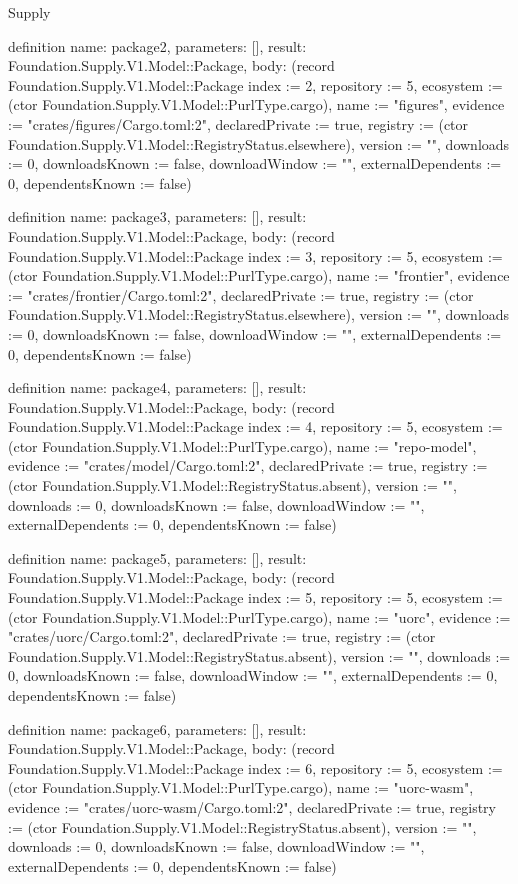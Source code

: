 \begin{lexlean}{Supply}
\begin{semanticmodule}
definition{
  name: package2,
  parameters: [],
  result: Foundation.Supply.V1.Model::Package,
  body: (record Foundation.Supply.V1.Model::Package {index := 2, repository := 5, ecosystem := (ctor Foundation.Supply.V1.Model::PurlType.cargo), name := "figures", evidence := "crates/figures/Cargo.toml:2", declaredPrivate := true, registry := (ctor Foundation.Supply.V1.Model::RegistryStatus.elsewhere), version := "", downloads := 0, downloadsKnown := false, downloadWindow := "", externalDependents := 0, dependentsKnown := false})
}

definition{
  name: package3,
  parameters: [],
  result: Foundation.Supply.V1.Model::Package,
  body: (record Foundation.Supply.V1.Model::Package {index := 3, repository := 5, ecosystem := (ctor Foundation.Supply.V1.Model::PurlType.cargo), name := "frontier", evidence := "crates/frontier/Cargo.toml:2", declaredPrivate := true, registry := (ctor Foundation.Supply.V1.Model::RegistryStatus.elsewhere), version := "", downloads := 0, downloadsKnown := false, downloadWindow := "", externalDependents := 0, dependentsKnown := false})
}

definition{
  name: package4,
  parameters: [],
  result: Foundation.Supply.V1.Model::Package,
  body: (record Foundation.Supply.V1.Model::Package {index := 4, repository := 5, ecosystem := (ctor Foundation.Supply.V1.Model::PurlType.cargo), name := "repo-model", evidence := "crates/model/Cargo.toml:2", declaredPrivate := true, registry := (ctor Foundation.Supply.V1.Model::RegistryStatus.absent), version := "", downloads := 0, downloadsKnown := false, downloadWindow := "", externalDependents := 0, dependentsKnown := false})
}

definition{
  name: package5,
  parameters: [],
  result: Foundation.Supply.V1.Model::Package,
  body: (record Foundation.Supply.V1.Model::Package {index := 5, repository := 5, ecosystem := (ctor Foundation.Supply.V1.Model::PurlType.cargo), name := "uorc", evidence := "crates/uorc/Cargo.toml:2", declaredPrivate := true, registry := (ctor Foundation.Supply.V1.Model::RegistryStatus.absent), version := "", downloads := 0, downloadsKnown := false, downloadWindow := "", externalDependents := 0, dependentsKnown := false})
}

definition{
  name: package6,
  parameters: [],
  result: Foundation.Supply.V1.Model::Package,
  body: (record Foundation.Supply.V1.Model::Package {index := 6, repository := 5, ecosystem := (ctor Foundation.Supply.V1.Model::PurlType.cargo), name := "uorc-wasm", evidence := "crates/uorc-wasm/Cargo.toml:2", declaredPrivate := true, registry := (ctor Foundation.Supply.V1.Model::RegistryStatus.absent), version := "", downloads := 0, downloadsKnown := false, downloadWindow := "", externalDependents := 0, dependentsKnown := false})
}


\end{semanticmodule}
\end{lexlean}
